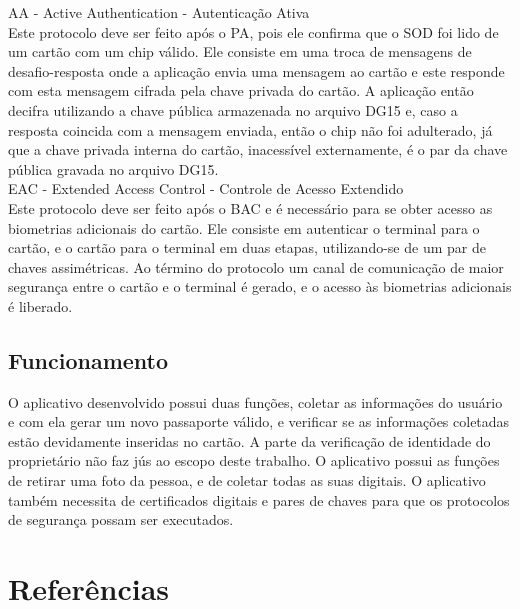 \documentclass{article}
\begin{document}
\begin{justify}
			\hspace*{2cm} AA - Active Authentication - Autenticação Ativa\\
			\hspace*{2cm} Este protocolo deve ser feito após o PA, pois ele confirma que o SOD foi lido de um cartão com um chip válido. Ele consiste em uma troca de mensagens de desafio-resposta onde a aplicação envia uma mensagem ao cartão e este responde com esta mensagem cifrada pela chave privada do cartão. A aplicação então decifra utilizando a chave pública armazenada no arquivo DG15 e, caso a resposta coincida com a mensagem enviada, então o chip não foi adulterado, já que a chave privada interna do cartão, inacessível externamente, é o par da chave pública gravada no arquivo DG15.\\
			
			\hspace*{2cm} EAC - Extended Access Control - Controle de Acesso Extendido\\
			\hspace*{2cm} Este protocolo deve ser feito após o BAC e é necessário para se obter acesso as biometrias adicionais do cartão. Ele consiste em autenticar o terminal para o cartão, e o cartão para o terminal em duas etapas, utilizando-se de um par de chaves assimétricas. Ao término do protocolo um canal de comunicação de maior segurança entre o cartão e o terminal é gerado, e o acesso às biometrias adicionais é liberado.
			
		\end{justify}

	\subsection{Funcionamento}
		\begin{justify}
			\hspace{2cm} O aplicativo desenvolvido possui duas funções, coletar as informações do usuário e com ela gerar um novo passaporte válido, e verificar se as informações coletadas estão devidamente inseridas no cartão. A parte da verificação de identidade do proprietário não faz jús ao escopo deste trabalho. O aplicativo possui as funções de retirar uma foto da pessoa, e de coletar todas as suas digitais. O aplicativo também necessita de certificados digitais e pares de chaves para que os protocolos de segurança possam ser executados.
			
		\end{justify}

	\section{}
		\begin{justify}
			
			
		\end{justify}

\begingroup
	\section{Referências}
		\renewcommand{\section}[2]{}
		
		
		
		
\endgroup
\end{document}
